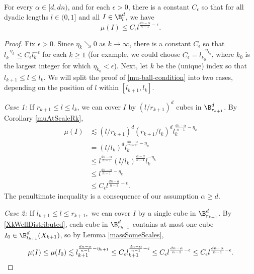 \begin{lemma} \label{frostmanBound}
For every $\alpha \in [d, dn)$, and for each $\epsilon>0$, there is a constant $C_\epsilon$ so that for all dyadic lengths $l\in (0,1]$ and all $I \in \B_l^d$, we have
	\begin{equation} 
	\mu(I) \leq C_{\epsilon} l^{\frac{dn - \alpha}{n - 1} - \epsilon}. \label{mu-ball-condition} 
	\end{equation} 
\end{lemma}
\begin{proof} Fix $\epsilon > 0$. Since $\eta_k \searrow 0$ as $k\to\infty$, there is a constant $C_{\epsilon}$ so that $l_k^{-\eta_k}\leq C_{\epsilon}l_k^{-\epsilon}$ for each $k\geq 1$ (for example, we could choose $C_{\epsilon}=l_{k_0}^{-\eta_{k_0}}$, where $k_0$ is the largest integer for which $\eta_{k_0}<\epsilon$). Next, let $k$ be the (unique) index so that $l_{k+1}\leq l\leq l_{k}$. We will split the proof of \eqref{mu-ball-condition} into two cases, depending on the position of  $l$ within $[l_{k+1}, l_k]$. 

	{\em{Case 1: }} If $r_{k+1} \leq l \leq l_k$, 
	we can cover $I$ by $(l/r_{k+1})^d$ cubes in $\B^d_{r_{k+1}}$. By Corollary \ref{muAtScaleRk},
	\begin{equation}
	\begin{split}
	\mu(I) & \lesssim (l/r_{k+1})^d (r_{k+1}/l_k)^d l_k^{\frac{dn-\alpha}{n-1}-\eta_k} \\
	& =(l/l_k)^d l_k^{\frac{dn-\alpha}{n-1}-\eta_{k}}\\
	& \leq l^{\frac{dn-\alpha}{n-1}} (l/l_k)^{\frac{\alpha - d}{n-1}} l_k^{-\eta_k}\\
	& \leq l^{\frac{dn-\alpha}{n-1} - \eta_k}  \\
	& \leq C_{\epsilon}l^{\frac{dn-\alpha}{n-1}-\epsilon}.
	\end{split}
	\end{equation}
The penultimate inequality is a consequence of our assumption $\alpha \geq d$. 

	{\em{Case 2: }} If $l_{k+1} \leq l \leq r_{k+1},$ we can cover $I$ by a single cube in $\B^d_{r_{k+1}}$. By \eqref{XkWellDistributed}, each cube in $\B^d_{r_{k+1}}$ contains at most one cube $I_0 \in \B^d_{l_{k+1}}(X_{k+1})$, so by Lemma \ref{massSomeScales},  
		$$ 
		\mu(I) \leq \mu(I_0) \lesssim l_{k+1}^{\frac{dn - \alpha}{n - 1} - \eta_{k+1}} 
		\leq C_{\epsilon}l_{k+1}^{\frac{dn - \alpha}{n - 1} - \epsilon}
		\leq C_{\epsilon}l^{\frac{dn - \alpha}{n - 1} - \epsilon} \leq C_{\epsilon}l^{\frac{dn - \alpha}{n - 1} - \epsilon }.\qedhere
		$$

\end{proof}


